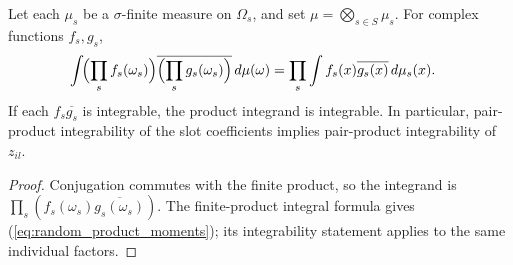 \begin{theorem}\label{thm:random_product_moments}
    \leanok
    Let each $\mu_s$ be a $\sigma$-finite measure on $\Omega_s$, and set
    $\mu=\bigotimes_{s\in S}\mu_s$. For complex functions $f_s,g_s$,
    \begin{align}
        \int\!\Bigl(\prod_s f_s(\omega_s)\Bigr)
        \overline{\Bigl(\prod_s g_s(\omega_s)\Bigr)}\,d\mu(\omega)
         & =\prod_s\int f_s(x)\overline{g_s(x)}\,d\mu_s(x).
        \label{eq:random_product_moments}
    \end{align}
    If each $f_s\overline{g_s}$ is integrable, the product integrand is
    integrable. In particular, pair-product integrability of the slot
    coefficients implies pair-product integrability of $z_{il}$.
\end{theorem}

\begin{proof}\leanok
    Conjugation commutes with the finite product, so the integrand is
    $\prod_s(f_s(\omega_s)\overline{g_s(\omega_s)})$.
    The finite-product integral formula gives
    (\ref{eq:random_product_moments}); its integrability statement applies to
    the same individual factors.
\end{proof}

